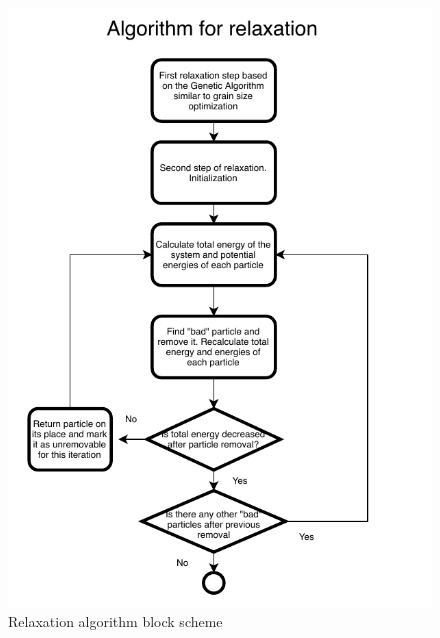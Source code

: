 \documentclass[12pt]{report}
\begin{document}
\begin{figure}
    \centering
    \includegraphics[width=5.0in]{RelaxationCommonBlockScheme}
    \caption{Relaxation algorithm block scheme}
    \label{relaxation block}
\end{figure}
\end{document}
